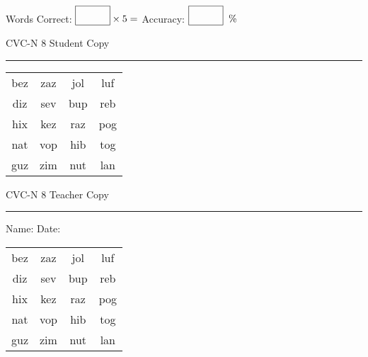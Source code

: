 \documentclass{memoir}
\begin{document}
\small

Words Correct: $\fbox{\phantom{\huge 100}} \times 5 = $ Accuracy: $\fbox{\phantom{\huge 100}}\;\; \%$ 

\vfill

\newpage


\footnotesize \noindent
CVC-N 8 \hfill Student Copy
\smallskip
\hrule

\Large

\setlength{\tabcolsep}{14pt}
\def\arraystretch{2}

{\selectfont


\begin{vplace}[0.5]
\begin{center}
\begin{tabular}{cccc}
bez & zaz & jol & luf \\
diz & sev & bup & reb \\
hix & kez & raz & pog \\
nat & vop & hib & tog \\
guz & zim & nut & lan \\
\end{tabular}
\end{center}
\end{vplace}

}

\newpage

\footnotesize \noindent
CVC-N 8 \hfill Teacher Copy
\smallskip
\hrule

\small

\vfill

\noindent
Name: \underline{\hspace{1.75in}} \hfill Date: \underline{\hspace{1in}}

\Large

{\selectfont


\begin{vplace}[0.5]
\begin{center}
\begin{tabular}{cccc}
bez & zaz & jol & luf \\
diz & sev & bup & reb \\
hix & kez & raz & pog \\
nat & vop & hib & tog \\
guz & zim & nut & lan \\
\end{tabular}
\end{center}
\end{vplace}



}
\end{document}
